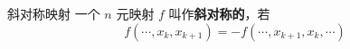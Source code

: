 

\begin{definition}{斜对称映射}
一个 $n$ 元映射 $f$ 叫作\textbf{斜对称的}，若
\begin{equation}
f(\cdots,x_k,x_{k+1})=-f(\cdots,x_{k+1},x_k,\cdots)
\end{equation}

\end{definition}